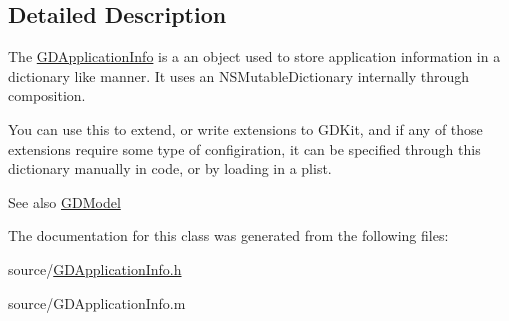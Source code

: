 \subsection{Detailed Description}
The \hyperlink{interface_g_d_application_info}{GDApplicationInfo} is a an object used to store application information in a dictionary like manner. It uses an NSMutableDictionary internally through composition.

You can use this to extend, or write extensions to GDKit, and if any of those extensions require some type of configiration, it can be specified through this dictionary manually in code, or by loading in a plist.

\begin{DoxySeeAlso}{See also}
\hyperlink{interface_g_d_model}{GDModel} 
\end{DoxySeeAlso}


The documentation for this class was generated from the following files:\begin{DoxyCompactItemize}
\item 
source/\hyperlink{_g_d_application_info_8h}{GDApplicationInfo.h}\item 
source/GDApplicationInfo.m\end{DoxyCompactItemize}
